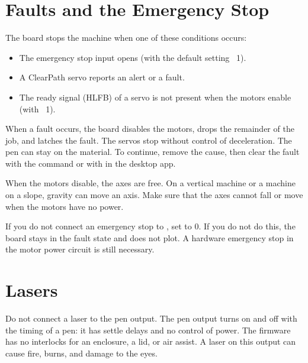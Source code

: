 \section{Faults and the Emergency Stop}\label{sec:fault-behavior}

The board stops the machine when one of these conditions occurs:

\begin{itemize}
  \item The emergency stop input  opens (with the default setting
        ~1).
  \item A ClearPath servo reports an alert or a fault.
  \item The ready signal (HLFB) of a servo is not present when the motors
        enable (with ~1).
\end{itemize}

When a fault occurs, the board disables the motors, drops the remainder of
the job, and latches the fault. The servos stop without control of
deceleration. The pen can stay on the material. To continue, remove the
cause, then clear the fault with the  command or with
 in the desktop app.

\begin{caution}
When the motors disable, the axes are free. On a vertical machine or a
machine on a slope, gravity can move an axis. Make sure that the axes cannot
fall or move when the motors have no power.
\end{caution}

\begin{note}
\notelabel If you do not connect an emergency stop to , set
 to 0. If you do not do this, the board stays in the fault
state and does not plot. A hardware emergency stop in the motor power circuit
is still necessary.
\end{note}

\section{Lasers}

\begin{warning}
Do not connect a laser to the pen output. The pen output turns on and off
with the timing of a pen: it has settle delays and no control of power. The
firmware has no interlocks for an enclosure, a lid, or air assist. A laser on
this output can cause fire, burns, and damage to the eyes.
\end{warning}


